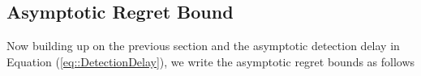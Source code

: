 \documentclass{article} %
\newcommand{\dfq}{\vcentcolon=}
\begin{document}
\begin{comment}
Now, defining 
\begin{align}
& D \dfq \max\limits_\ell D_\ell \\ 
& T_{c_{\max}} \dfq \max\limits_{\ell} c_{\ell+1}-c_{\ell}-d_{\ell} \\ 
& \kD \dfq  \max\limits_{\ell} \kD_{\bDelta,r,c_\ell}
\end{align}

with again $\delta_2 \in (0, 1)$, we can express the total regret bound as 
\begin{align*}
    \sum\limits_{\ell=0}^{K_T-1} \mathfrak{R} \left(M_\ell, \texttt{R-BOCPD-UCRL2}, o, \left[c_\ell, c_{\ell+1}\right) \right) 
    & \leq 34 K_T D O \sqrt{A T_{c_{\max}}\log\left(\frac{T_{c_{\max}}}{\delta_2} \right)} + (K_T-1) \kD
\end{align*}

which holds with probability of at least $1- K_T \left(\frac{1}{4T_{c_{\max}} ^\frac{5}{4}} + 1 \right) \delta_2$. 

\textcolor{red}{(Rest to be modified soon).} \\
Then, letting: $\delta \dfq K_T\left(\frac{1}{4T_{c_{\max}}^\frac{5}{4}} + 1\right) \delta_2$, we get the following control that holds true with probability of at least $1-\delta$:

\begin{align*}
    \sum_{\ell=1}^{K_T} \Delta\left(o_1, c_{\ell+1}-1-c_{\ell}+d_{\ell}\right) 
    & \leq 34 K_T D O \sqrt{A}\: \sqrt{T_{c_{\max}}\log\left( K_T \times \frac{\tfrac{1}{4} T_{c_{\max}}^{-\frac{1}{4}} + T_{c_{\max}}}{\delta} \right)} 
\end{align*}


Finally, with probability of at least $1-\delta$, the total regret upper bound takes the following form:

\begin{align*}
    \sum\limits_{\ell=0}^{K_T-1} \mathfrak{R} \left(M_\ell, \texttt{R-BOCPD-UCRL2}, o, \left[c_\ell, c_{\ell+1}\right) \right) 
    & \leq 34 K_T D O \sqrt{A}\: \sqrt{T_{c_{\max}}\log\left( K_T \times \frac{\tfrac{1}{4} T_{c_{\max}}^{-\frac{1}{4}} + T_{c_{\max}}}{\delta} \right)} + (K_T-1) \kD
\end{align*}
\end{comment}

\subsection{Asymptotic Regret Bound}
Now building up on the previous section and the asymptotic detection delay in Equation (\ref{eq::DetectionDelay}), we write the asymptotic regret bounds as follows 
\end{document}

